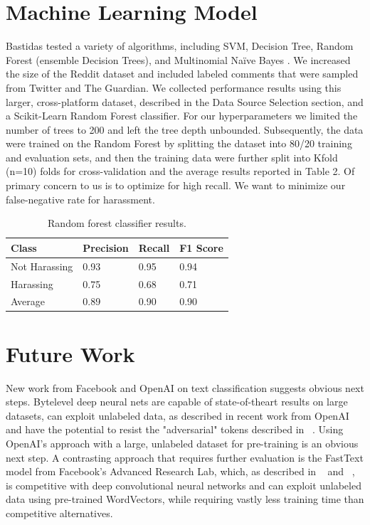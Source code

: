 \documentclass[11pt,a4paper]{article}
\begin{document}
\section{Machine Learning Model}
Bastidas tested a variety of algorithms, including
SVM, Decision Tree, Random Forest (ensemble
Decision Trees), and Multinomial Naïve Bayes
\cite{Bastidas:2016}. We increased the size of the
Reddit dataset and included labeled comments that
were sampled from Twitter and The Guardian. We
collected performance results using this larger,
cross-platform dataset, described in the Data
Source Selection section, and a Scikit-Learn Random
Forest classifier. For our hyperparameters we
limited the number of trees to 200 and left the tree
depth unbounded. Subsequently, the data were
trained on the Random Forest by splitting the dataset
into 80/20 training and evaluation sets, and
then the training data were further split into Kfold
(n=10) folds for cross-validation and the average
results reported in Table 2. Of primary concern to
us is to optimize for high recall. We want to minimize
our false-negative rate for harassment.

\begin{table}[h]
\begin{center}
\begin{tabular}{|l|l|l|l|}
\hline \bf Class & \bf Precision & \bf Recall & \bf F1 Score \\ \hline
Not Harassing & 0.93 & 0.95 & 0.94 \\
Harassing & 0.75 & 0.68 & 0.71 \\
Average & 0.89 & 0.90 & 0.90 \\
\hline
\end{tabular}
\end{center}
\caption{\label{font-table} Random forest classifier results. }
\end{table}

\section{Future Work}
New work from Facebook and OpenAI on text
classification suggests obvious next steps. Bytelevel
deep neural nets are capable of state-of-theart
results on large datasets, can exploit unlabeled
data, as described in recent work from OpenAI
~\cite{Radford:2017} and
have the potential to resist the "adversarial" tokens
described in ~\cite{Hosseini:2017}. Using OpenAI's approach with a large,
unlabeled dataset for pre-training is an obvious
next step. A contrasting approach that requires further
evaluation is the FastText model from Facebook's
Advanced Research Lab, which, as described
in ~\cite{Joulin:2016} and ~\cite{Bojanowski:2016}, is competitive with deep convolutional
neural networks and can exploit unlabeled
data using pre-trained WordVectors, while requiring
vastly less training time than competitive
alternatives.
\end{document}
